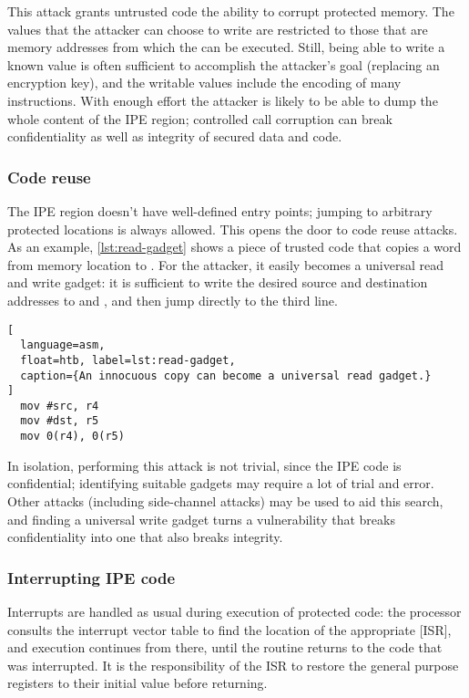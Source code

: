 This attack grants untrusted code the ability to corrupt protected memory. The values that the attacker can choose to write are restricted to those that are memory addresses from which the  can be executed. Still, being able to write a known value is often sufficient to accomplish the attacker's goal (\eg replacing an encryption key), and the writable values include the encoding of many instructions. With enough effort the attacker is likely to be able to dump the whole content of the IPE region; controlled call corruption can break confidentiality as well as integrity of secured data and code.

\subsubsection{Code reuse}
\label{sec:code-reuse}

The IPE region doesn't have well-defined entry points; jumping to arbitrary protected locations is always allowed. This opens the door to code reuse attacks. As an example, \cref{lst:read-gadget} shows a piece of trusted code that copies a word from memory location   to . For the attacker, it easily becomes a universal read and write gadget: it is sufficient to write the desired source and destination addresses to  and , and then jump directly to the third line.

\begin{lstlisting}[
  language=asm,
  float=htb, label=lst:read-gadget,
  caption={An innocuous copy can become a universal read gadget.}
]
  mov #src, r4
  mov #dst, r5
  mov 0(r4), 0(r5)
\end{lstlisting}

In isolation, performing this attack is not trivial, since the IPE code is confidential; identifying suitable gadgets may require a lot of trial and error. Other attacks (including side-channel attacks) may be used to aid this search, and finding a universal write gadget turns a vulnerability that breaks confidentiality into one that also breaks integrity.

\subsubsection{Interrupting IPE code}
\label{sec:interrupts}

Interrupts are handled as usual during execution of protected code: the processor consults the interrupt vector table to find the location of the appropriate [ISR], and execution continues from there, until the routine returns to the code that was interrupted. It is the responsibility of the ISR to restore the general purpose registers to their initial value before returning.

